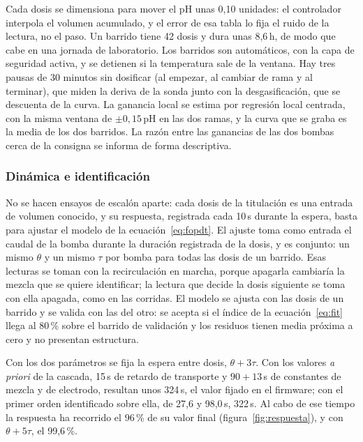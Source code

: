 Cada dosis se dimensiona para mover el pH unas 0,10 unidades: el controlador interpola el volumen acumulado, y el error de esa tabla lo fija el ruido de la lectura, no el paso. Un barrido tiene 42 dosis y dura unas 8,6\,h, de modo que cabe en una jornada de laboratorio. Los barridos son automáticos, con la capa de seguridad activa, y se detienen si la temperatura sale de la ventana. Hay tres pausas de 30 minutos sin dosificar (al empezar, al cambiar de rama y al terminar), que miden la deriva de la sonda junto con la desgasificación, que se descuenta de la curva. La ganancia local se estima por regresión local centrada, con la misma ventana de $\pm0{,}15$\,pH en las dos ramas, y la curva que se graba es la media de los dos barridos. La razón entre las ganancias de las dos bombas cerca de la consigna se informa de forma descriptiva.

\subsubsection{Dinámica e identificación}\label{sec:ident}
No se hacen ensayos de escalón aparte: cada dosis de la titulación es una entrada de volumen conocido, y su respuesta, registrada cada 10\,s durante la espera, basta para ajustar el modelo de la ecuación~\eqref{eq:fopdt}. El ajuste toma como entrada el caudal de la bomba durante la duración registrada de la dosis, y es conjunto: un mismo $\theta$ y un mismo $\tau$ por bomba para todas las dosis de un barrido. Esas lecturas se toman con la recirculación en marcha, porque apagarla cambiaría la mezcla que se quiere identificar; la lectura que decide la dosis siguiente se toma con ella apagada, como en las corridas. El modelo se ajusta con las dosis de un barrido y se valida con las del otro: se acepta si el índice de la ecuación~\eqref{eq:fit} llega al 80\,\% sobre el barrido de validación y los residuos tienen media próxima a cero y no presentan estructura.

Con los dos parámetros se fija la espera entre dosis, $\theta+3\tau$. Con los valores \emph{a priori} de la cascada, 15\,s de retardo de transporte y $90+13$\,s de constantes de mezcla y de electrodo, resultan unos 324\,s, el valor fijado en el firmware; con el primer orden identificado sobre ella, de 27,6 y 98,0\,s, 322\,s. Al cabo de ese tiempo la respuesta ha recorrido el 96\,\% de su valor final (figura~\ref{fig:respuesta}), y con $\theta+5\tau$, el 99,6\,\%.


